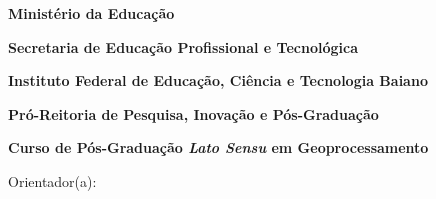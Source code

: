 \documentclass[12pt,oneside,a4paper,brazilian,english,fleqn]{abntex2}
\begin{document}

\begin{capa}
\begin{center}
{\bfseries Ministério da Educação\par}
{\bfseries Secretaria de Educação Profissional e Tecnológica\par}
{\bfseries Instituto Federal de Educação, Ciência e Tecnologia Baiano\par}
\vspace{2.5cm}
{\bfseries Pró-Reitoria de Pesquisa, Inovação e Pós-Graduação\par}
{\bfseries Curso de Pós-Graduação \textit{Lato Sensu} em Geoprocessamento\par}
\vfill
{\imprimirautor\par}
\vspace{2.0cm}
{\bfseries\imprimirtitulo\par}
\vfill
{\imprimirlocal\par}
{\imprimirdata\par}
\end{center}
\end{capa}

\begin{folhaderosto}
\begin{center}
{\imprimirautor\par}
\vspace{2.0cm}
{\bfseries\imprimirtitulo\par}
\vspace{2.5cm}
\hspace{0.47\textwidth}
\begin{minipage}{0.52\textwidth}
\SingleSpacing
\imprimirpreambulo
\par\vspace{1.2cm}
Orientador(a): \imprimirorientador
\end{minipage}
\vfill
{\imprimirlocal\par}
{\imprimirdata\par}
\end{center}
\end{folhaderosto}
\end{document}
